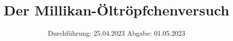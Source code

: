 

\subject{V503}
\title{Der Millikan-Öltröpfchenversuch}
\date{%
  Durchführung: 25.04.2023
  \hspace{3em}
  Abgabe: 01.05.2023
}



\maketitle
\thispagestyle{empty}
\tableofcontents
\newpage








\printbibliography{}


